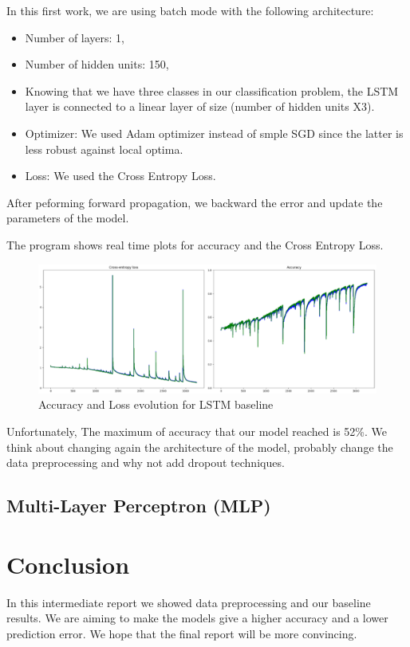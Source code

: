 \documentclass[a4paper,english,12pt]{article}
\begin{document}
In this first work, we are using batch mode with the following architecture:
\begin{itemize}
	\item Number of layers: 1,
	\item Number of hidden units: 150,
	\item Knowing that we have three classes in our classification problem, the LSTM layer is connected to a linear layer of size (number of hidden units X3).
	\item Optimizer: We used Adam optimizer instead of smple SGD since the latter is less robust against local optima.
	\item Loss: We used the Cross Entropy Loss. 
\end{itemize}

After peforming forward propagation, we backward the error and update the parameters of the model.

The program shows real time plots for accuracy and the Cross Entropy Loss.

\begin{figure}[H]
\centering
\includegraphics[scale=0.85]{acc_loss}
\caption{Accuracy and Loss evolution for LSTM baseline}
\end{figure}

Unfortunately, The maximum of accuracy that our model reached is 52\%. We think about changing again the architecture of the model, probably change the data preprocessing and why not add dropout techniques.

\subsection{Multi-Layer Perceptron (MLP)}


\section{Conclusion}
In this intermediate report we showed data preprocessing and our baseline results. We are aiming to make the models give a higher accuracy and a lower prediction error. We hope that the final report will be more convincing.  
\end{document}
